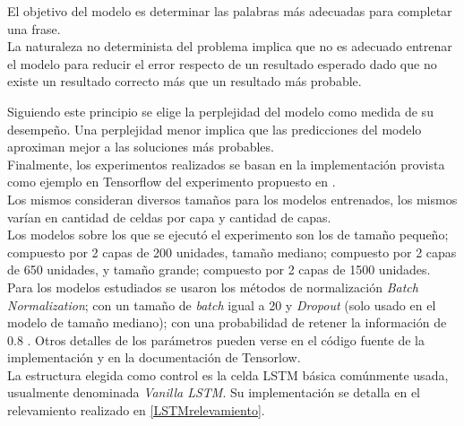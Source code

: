\documentclass{article}
\begin{document}
El objetivo del modelo es determinar las palabras más adecuadas para completar una frase.\\

La naturaleza no determinista del problema implica que no es adecuado entrenar el modelo para reducir el error respecto de un resultado esperado dado que no existe un resultado correcto más que un resultado más probable.

Siguiendo este principio se elige la perplejidad del modelo como medida de su desempeño. Una perplejidad menor implica que las predicciones del modelo aproximan mejor a las soluciones más probables.\\

Finalmente, los experimentos realizados se basan en la implementación provista como ejemplo en Tensorflow del experimento propuesto en \cite{experimentPapper}.\\

Los mismos consideran diversos tamaños para los modelos entrenados, los mismos varían en cantidad de celdas por capa y cantidad de capas.\\

Los modelos sobre los que se ejecutó el experimento son los de tamaño pequeño; compuesto por 2 capas de 200 unidades, tamaño mediano; compuesto por 2 capas de 650 unidades, y tamaño grande; compuesto por 2 capas de 1500 unidades.\\

Para los modelos estudiados se usaron los métodos de normalización \textit{Batch Normalization}; con un tamaño de \textit{batch} igual a 20  y \textit{Dropout} (solo usado en el modelo de tamaño mediano); con una probabilidad de retener la información de 0.8 . Otros detalles de los parámetros pueden verse en el código fuente de la implementación y en la documentación de Tensorlow.\\

La estructura elegida como control es la celda LSTM básica comúnmente usada, usualmente denominada \textit{Vanilla LSTM}. Su implementación se detalla en el relevamiento realizado en \ref{LSTMrelevamiento}.
\end{document}
